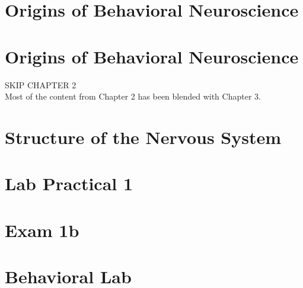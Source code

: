\documentclass[12pt, oneside]{book}
\begin{document}

\setcounter{chapter}{0}
\chapter{Origins of Behavioral Neuroscience}
\vspace*{-0.25in}

\setcounter{chapter}{0}
\chapter{Origins of Behavioral Neuroscience}
\vspace*{-0.25in}


% 
\newpage
{}
\fancyhead[R]{}

\begin{center}
    \textsc{SKIP CHAPTER 2} \\
    Most of the content from Chapter 2 has been blended with Chapter 3. \\
\end{center}
\newpage

\setcounter{chapter}{2}
\chapter{Structure of the Nervous System}
\vspace*{-0.25in}


\chapter*{Lab Practical 1}
\vspace*{-0.25in}


\chapter*{Exam 1b}
\vspace*{-0.25in}


\chapter*{Behavioral Lab}
\vspace*{-0.25in}








\end{document}
